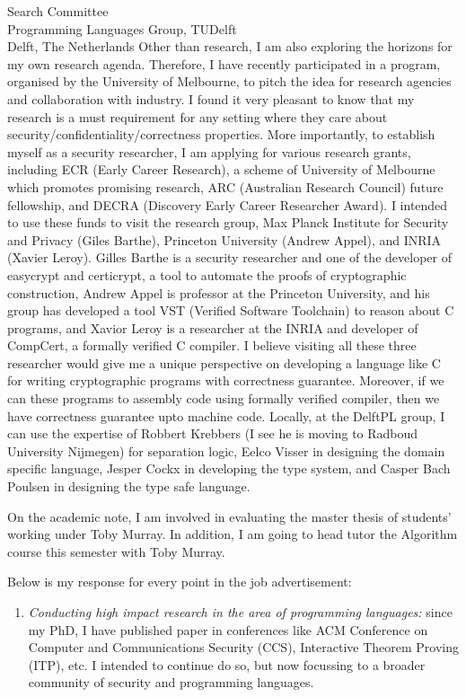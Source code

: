 \documentclass{letter}
\begin{document}
\begin{letter}{Search Committee\\
Programming Languages Group, TUDelft\\
Delft, The Netherlands}
Other than research, I am also exploring the horizons for my own research agenda.  
Therefore, I have recently participated in a program, organised by the University of Melbourne, 
to pitch the idea for research agencies and  collaboration with industry. I found it 
very pleasant to know that my research is  a must requirement  
for any setting where they care about security/confidentiality/correctness properties. 
More importantly,  to establish myself 
as a security researcher,  I am applying for 
various research grants, including ECR (Early Career Research), 
a scheme of University of Melbourne which promotes promising research, 
ARC (Australian Research Council) future fellowship, and 
DECRA (Discovery Early Career Researcher Award). 
I intended to use these funds to visit the research group, 
Max Planck Institute for Security and Privacy (Giles Barthe),
Princeton University (Andrew Appel), and INRIA (Xavier Leroy). 
Gilles Barthe is a security researcher and one of the developer of 
easycrypt and certicrypt, a tool to automate the proofs of 
cryptographic construction, Andrew Appel is professor at the 
Princeton University, and his group has developed a tool VST
(Verified Software Toolchain) to reason about C programs, and 
Xavior Leroy is a researcher at the INRIA and developer of 
CompCert, a formally verified C compiler. I believe visiting all 
these three researcher would give me a unique perspective 
on developing a language like C for writing cryptographic programs
with correctness guarantee.  Moreover, if we can these 
programs to assembly code  using formally verified compiler, then 
we have correctness guarantee upto machine code.  Locally, 
at the DelftPL group, I can use the expertise of Robbert Krebbers 
(I see he is moving to Radboud University Nijmegen) 
for separation logic, Eelco Visser in designing the  domain specific 
language, Jesper Cockx in developing the type system, 
and  Casper Bach Poulsen in designing the type safe language.




On the academic note, I am involved in evaluating the master thesis of 
students' working under Toby Murray. In addition, I am going to head tutor the 
Algorithm course this semester with Toby Murray. 

 
Below is my response for every point in the job advertisement: 
\begin{enumerate}
\item \textit{Conducting high impact research in the area of programming languages:}
	since my PhD, I have published paper in  conferences like ACM Conference on Computer and Communications Security (CCS), 
	Interactive Theorem Proving (ITP),  etc. I intended to continue do so, but now focussing to a broader community of 
	 security and programming languages. 
	

\end{enumerate}
\end{letter}
\end{document}
